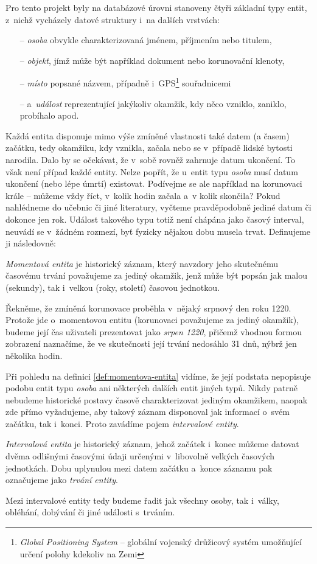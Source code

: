 		Pro tento projekt byly na databázové úrovni stanoveny čtyři základní typy entit, z~nichž vycházely datové struktury i~na dalších vrstvách:
		\begin{itemize}
			\item[--] \emph{osoba} obvykle charakterizovaná jménem, příjmením nebo titulem,
			\item[--] \emph{objekt}, jímž může být například dokument nebo korunovační klenoty,
			\item[--] \emph{místo} popsané názvem, případně i~GPS\footnote{\emph{Global Positioning System} -- globální vojenský drůžicový systém umožňující určení polohy kdekoliv na Zemi} souřadnicemi
			\item[--] a~\emph{událost} reprezentující jakýkoliv okamžik, kdy něco vzniklo, zaniklo, pro\-bíhalo apod.
		\end{itemize}
		Každá entita disponuje mimo výše zmíněné vlastnosti také datem (a časem) začátku, tedy okamžiku, kdy vznikla, začala nebo se v~případě lidské bytosti narodila. Dalo by se očekávat, že v~sobě rovněž zahrnuje datum ukončení. To však není případ každé entity. Nelze popřít, že u~entit typu \emph{osoba} musí datum ukončení (nebo lépe úmrtí) existovat. Podívejme se ale například na korunovaci krále -- můžeme vždy říct, v~kolik hodin začala a~v kolik skončila? Pokud nahlédneme do učebnic či jiné literatury, vyčteme pravděpodobně jediné datum či dokonce jen rok. Událost takového typu totiž není chápána jako časový interval, neuvádí se v~žádném rozmezí, byť fyzicky nějakou dobu musela trvat. Definujeme ji následovně:
		\begin{mydef}
			\label{def:momentova-entita}
			\emph{Momentová entita} je historický záznam, který navzdory jeho sku\-tečnému časovému trvání považujeme za jediný okamžik, jenž může být po\-psán jak malou (sekundy), tak i~velkou (roky, století) časovou jednotkou.
		\end{mydef}
		Řekněme, že zmíněná korunovace proběhla v~nějaký srpnový den roku 1220. Protože jde o~momentovou entitu (korunovaci považujeme za jediný okamžik), budeme její čas uživateli prezentovat jako \emph{srpen 1220}, přičemž vhodnou formou zobrazení naznačíme, že ve skutečnosti její trvání nedosáhlo 31 dnů, nýbrž jen několika hodin.
		
		Při pohledu na definici \ref{def:momentova-entita} vidíme, že její podstata nepopisuje podobu entit typu \emph{osoba} ani některých dalších entit jiných typů. Nikdy patrně nebudeme historické postavy časově charakterizovat jediným okamžikem, naopak zde přímo vyžadujeme, aby takový záznam disponoval jak informací o~svém začátku, tak i~konci. Proto zavádíme pojem \emph{intervalové entity}.
		\begin{mydef}
			\label{def:intervalova-entita}
			\emph{Intervalová entita} je historický záznam, jehož začátek i~konec můžeme datovat dvěma odlišnými časovými údaji určenými v~libovolně velkých časových jednotkách. Dobu uplynulou mezi datem začátku a~konce záznamu pak označujeme jako \emph{trvání entity}.
		\end{mydef}
		Mezi intervalové entity tedy budeme řadit jak všechny osoby, tak i~války, obléhání, dobývání či jiné události s~trváním.
		
